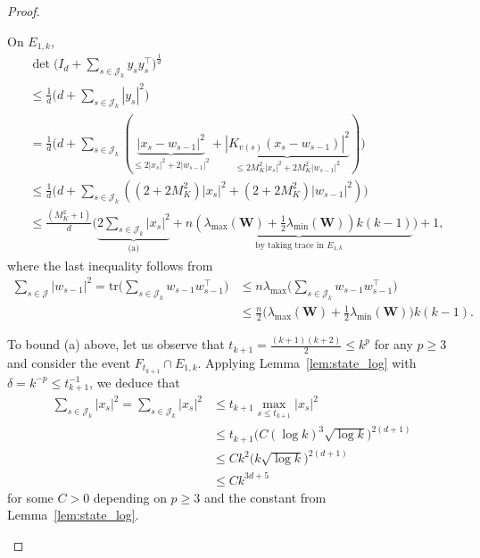 \documentclass[11pt]{article}
\theoremstyle{plain}
\theoremstyle{definition}
\theoremstyle{remark}
\begin{document}
\begin{proof}
\begin{itemize}
On $E_{1,k}$, 
\begin{align*}
&\det\bigg(I_d+\sum_{s \in\mathcal{J}_k} y_s y_s^{\top}\bigg)^{\frac{1}{d}} \\
&\leq \frac{1}{d}\bigg(d+\sum_{s \in\mathcal{J}_k}|y_s|^2\bigg)\\
& = \frac{1}{d}\bigg(d+\sum_{s \in\mathcal{J}_k}(\underbrace{|x_s-w_{s-1}|^2}_{\leq 2|x_s|^2+2|w_{s-1}|^2}+\underbrace{|K_{v(s)}(x_s-w_{s-1})|^2}_{\leq 2M_K^2|x_s|^2+2M_K^2|w_{s-1}|^2})\bigg)\\
& \leq \frac{1}{d}\bigg(d+\sum_{s \in\mathcal{J}_k}((2+2M_K^2)|x_s|^2+(2+2M_K^2)|w_{s-1}|^2)\bigg)\\
& \leq  \frac{(M_K^2+1)}{d}\bigg(\underbrace{2\sum_{s \in\mathcal{J}_k}|x_s|^2}_\text{(a)}+ \underbrace{n(\lambda_{\max}(\mathbf{W}) +\frac{1}{2}\lambda_{\min}(\mathbf{W}))k(k-1)}_\text{by taking trace in $E_{1,k}$}\bigg)+1,
\end{align*}
where the last inequality follows from
\begin{align*}
\sum_{s\in\mathcal{J}} |w_{s-1}|^2 =\mathrm{tr}\bigg(\sum_{s\in\mathcal{J}_k} w_{s-1} w_{s-1} ^\top\bigg) &\leq n \lambda_{\max}\bigg({\sum_{s\in\mathcal{J}_k} w_{s-1}w_{s-1}^\top}\bigg)\\
& \leq \frac{n}{2}\bigg(\lambda_{\max}(\mathbf{W}) +\frac{1}{2}\lambda_{\min}(\mathbf{W})\bigg)k(k-1).
\end{align*}

To bound (a) above, let us observe that $t_{k+1}=\frac{(k+1)(k+2)}{2} \leq k^p$ for any $p\geq 3$ and consider the event $F_{t_{k+1}} \cap E_{1,k}$. Applying Lemma~\ref{lem:state_log} with $\delta=k^{-p} \leq t_{k+1}^{-1}$, we deduce that
\begin{align*}
   \sum_{s\in\mathcal{J}_k} |x_s|^2=\sum_{s\in\mathcal{J}_k}|x_s|^2 & \leq t_{k+1} \max_{s \leq t_{k+1}}|x_s|^2\\
   &\leq t_{k+1} \bigg( C(\log k)^3 \sqrt{\log k} \bigg)^{2(d+1)}\\
   &\leq C k^2\bigg( k\sqrt{\log k}\bigg)^{2(d+1)}\\
   & \leq C k^{3d+5}
\end{align*}
for some $C>0$ depending on $p\geq 3$ and the constant from Lemma~\ref{lem:state_log}.


\end{itemize}
\end{proof}
\end{document}
